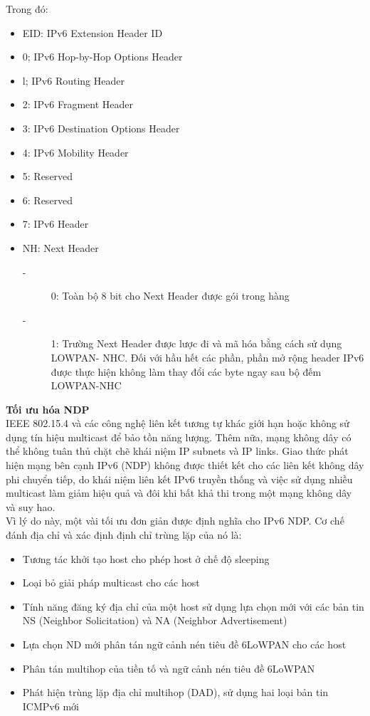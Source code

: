 \documentclass{report}
\begin{document}
Trong đó:
\begin{itemize}
	\item EID: IPv6 Extension Header ID
	\item 0; IPv6 Hop-by-Hop Options Header
	\item l; IPv6 Routing Header
	\item 2: IPv6 Fragment Header
	\item 3: IPv6 Destination Options Header
	\item 4: IPv6 Mobility Header
	\item 5: Reserved
	\item 6: Reserved
	\item 7: IPv6 Header
	\item NH: Next Header
	\begin{description}
		\item[-] 0: Toàn bộ 8 bit cho Next Header được gói trong hàng
		\item[-] 1: Trường Next Header được lược đi và mã hóa bằng cách sử dụng LOWPAN- NHC. Đối
		với hầu hết các phần, phần mở rộng header IPv6 được thực hiện không làm thay đổi các byte
		ngay sau bộ đếm LOWPAN-NHC
	\end{description}
\end{itemize}

\textbf{Tối ưu hóa NDP} \\

IEEE 802.15.4 và các công nghệ liên kết tương tự khác giới hạn hoặc không sử
dụng tín hiệu multicast để bảo tồn năng lượng. Thêm nữa, mạng không dây có thể
không tuân thủ chặt chẽ khái niệm IP subnets và IP links. Giao thức phát hiện mạng
bên cạnh IPv6 (NDP) không được thiết kết cho các liên kết không dây phi chuyển
tiếp, do khái niệm liên kết IPv6 truyền thống và việc sử dụng nhiều multicast làm
giảm hiệu quả và đôi khi bất khả thi trong một mạng không dây và suy hao. \\

Vì lý do này, một vài tối ưu đơn giản được định nghĩa cho IPv6 NDP. Cơ chế đánh
địa chỉ và xác định định chỉ trùng lặp của nó là: 
\begin{itemize}
	\item Tương tác khởi tạo host cho phép host ở chế độ sleeping
	\item Loại bỏ giải pháp multicast cho các host
	\item Tính năng đăng ký địa chỉ của một host sử dụng lựa chọn mới với các bản tin NS
	(Neighbor Solicitation) và NA (Neighbor Advertisement)
	\item Lựa chọn ND mới phân tán ngữ cảnh nén tiêu đề 6LoWPAN cho các host
	\item Phân tán multihop của tiền tố và ngữ cảnh nén tiêu đề 6LoWPAN
	\item Phát hiện trùng lặp địa chỉ multihop (DAD), sử dụng hai loại bản tin ICMPv6
	mới
\end{itemize}
\end{document}
